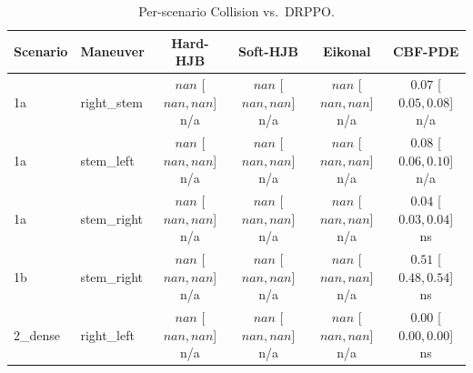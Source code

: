\begin{table}[ht]
\centering
\caption{Per-scenario Collision vs.\ DRPPO.}
\label{tab:per_scenario_collision_rate}
\begin{tabular}{llcccc}
\toprule
Scenario & Maneuver & Hard-HJB & Soft-HJB & Eikonal & CBF-PDE \\
\midrule
1a & right_stem & $nan$ [$nan, nan$] n/a & $nan$ [$nan, nan$] n/a & $nan$ [$nan, nan$] n/a & $0.07$ [$0.05, 0.08$] n/a \\
1a & stem_left & $nan$ [$nan, nan$] n/a & $nan$ [$nan, nan$] n/a & $nan$ [$nan, nan$] n/a & $0.08$ [$0.06, 0.10$] n/a \\
1a & stem_right & $nan$ [$nan, nan$] n/a & $nan$ [$nan, nan$] n/a & $nan$ [$nan, nan$] n/a & $0.04$ [$0.03, 0.04$] ns \\
1b & stem_right & $nan$ [$nan, nan$] n/a & $nan$ [$nan, nan$] n/a & $nan$ [$nan, nan$] n/a & $0.51$ [$0.48, 0.54$] ns \\
2_dense & right_left & $nan$ [$nan, nan$] n/a & $nan$ [$nan, nan$] n/a & $nan$ [$nan, nan$] n/a & $0.00$ [$0.00, 0.00$] ns \\
\bottomrule
\end{tabular}
\end{table}
